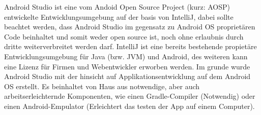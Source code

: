 Android Studio ist eine vom Andoid Open Source Project (kurz: AOSP) entwickelte Entwicklungsumgebung auf der basis von IntelliJ, dabei sollte beachtet werden, dass Android Studio im gegensatz zu Android OS
proprietären Code beinhaltet und somit weder open source ist, noch ohne erlaubnis durch dritte weiterverbreitet werden darf.
IntelliJ ist eine bereits bestehende propietäre Entwicklungsumgebung für Java (bzw. JVM) und Android, des weiteren kann eine Lizenz für Firmen und Webentwickler erworben werden.
Im grunde wurde Android Studio mit der hinsicht auf Applikationsentwicklung auf dem Android OS erstellt. Es beinhaltet von Haus aus notwendige, aber auch arbeitserleichternde Komponenten, wie
einen Gradle-Compiler (Notwendig) oder einen Android-Empulator (Erleichtert das testen der App auf einem Computer).\\

